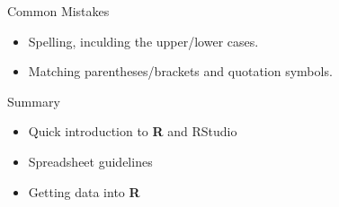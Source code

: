 \documentclass[ignorenonframetext,]{beamer}
\providecommand{\tightlist}{%
  \setlength{\itemsep}{0pt}\setlength{\parskip}{0pt}}
\begin{document}
\begin{frame}{Common Mistakes}

\begin{itemize}
\tightlist
\item
  Spelling, inculding the upper/lower cases.
\item
  Matching parentheses/brackets and quotation symbols.
\end{itemize}

\end{frame}

\begin{frame}{Summary}

\begin{itemize}
\tightlist
\item
  Quick introduction to \textbf{R} and RStudio
\item
  Spreadsheet guidelines
\item
  Getting data into \textbf{R}
\end{itemize}

\end{frame}
\end{document}
